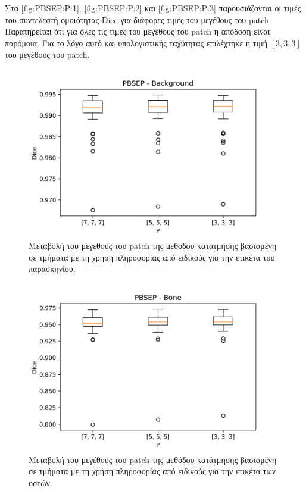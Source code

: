 \documentclass[a4paper,12pt]{article}
\begin{document}
Στα \autoref{fig:PBSEP:P:1}, \autoref{fig:PBSEP:P:2} και \autoref{fig:PBSEP:P:3}
παρουσιάζονται οι τιμές του συντελεστή ομοιότητας Dice για διάφορες τιμές του
μεγέθους του patch. Παρατηρείται ότι για όλες τις τιμές του μεγέθους του patch η
απόδοση είναι παρόμοια. Για το λόγο αυτό και υπολογιστικής ταχύτητας επιλέχτηκε
η τιμή $[3,3,3]$ του μεγέθους του patch.

\begin{figure}[H]
    \centering
    \includegraphics[width=0.85\linewidth]{PBSEP_P_Background_plot.png}
    \caption{Μεταβολή του μεγέθους του patch της μεθόδου κατάτμησης βασισμένη σε
             τμήματα με τη χρήση πληροφορίας από ειδικούς για την ετικέτα του
             παρασκηνίου.}
    \label{fig:PBSEP:P:1}
\end{figure}

\begin{figure}[H]
    \centering
    \includegraphics[width=0.85\linewidth]{PBSEP_P_Bone_plot.png}
    \caption{Μεταβολή του μεγέθους του patch της μεθόδου κατάτμησης βασισμένη σε
             τμήματα με τη χρήση πληροφορίας από ειδικούς για την ετικέτα των
             οστών.}
    \label{fig:PBSEP:P:2}
\end{figure}
\end{document}
